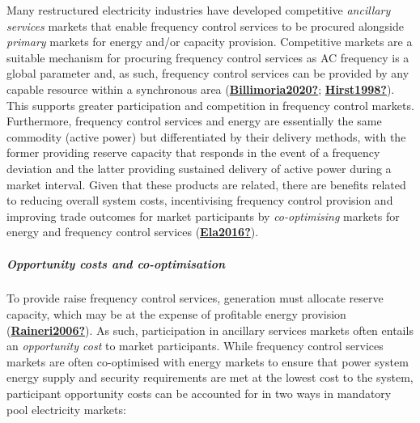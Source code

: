 \documentclass[12pt,a4paper,]{report}
\begin{document}
Many restructured electricity industries have developed competitive
\emph{ancillary services} markets that enable frequency control services
to be procured alongside \emph{primary} markets for energy and/or
capacity provision. Competitive markets are a suitable mechanism for
procuring frequency control services as AC frequency is a global
parameter and, as such, frequency control services can be provided by
any capable resource within a synchronous area
(\protect\hyperlink{ref-Billimoria2020}{\textbf{Billimoria2020?}};
\protect\hyperlink{ref-Hirst1998}{\textbf{Hirst1998?}}). This supports
greater participation and competition in frequency control markets.
Furthermore, frequency control services and energy are essentially the
same commodity (active power) but differentiated by their delivery
methods, with the former providing reserve capacity that responds in the
event of a frequency deviation and the latter providing sustained
delivery of active power during a market interval. Given that these
products are related, there are benefits related to reducing overall
system costs, incentivising frequency control provision and improving
trade outcomes for market participants by \emph{co-optimising} markets
for energy and frequency control services
(\protect\hyperlink{ref-Ela2016}{\textbf{Ela2016?}}).

\hypertarget{opportunity-costs-and-co-optimisation}{%
\subparagraph{Opportunity costs and
co-optimisation}\label{opportunity-costs-and-co-optimisation}}

To provide raise frequency control services, generation must allocate
reserve capacity, which may be at the expense of profitable energy
provision (\protect\hyperlink{ref-Raineri2006}{\textbf{Raineri2006?}}).
As such, participation in ancillary services markets often entails an
\emph{opportunity cost} to market participants. While frequency control
services markets are often co-optimised with energy markets to ensure
that power system energy supply and security requirements are met at the
lowest cost to the system, participant opportunity costs can be
accounted for in two ways in mandatory pool electricity markets:
\end{document}
